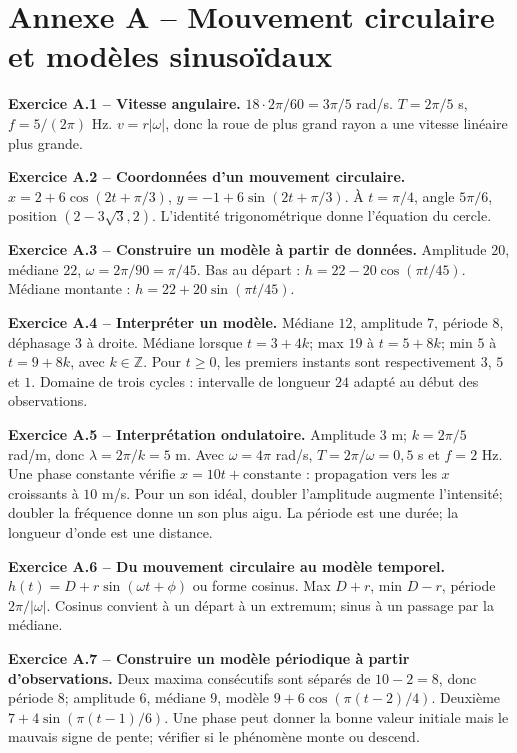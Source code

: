 \chapter*{Annexe A -- Mouvement circulaire et modèles sinusoïdaux}
\begin{answerbox}
\textbf{Exercice A.1 -- Vitesse angulaire.} $18\cdot2\pi/60=3\pi/5$ rad/s. $T=2\pi/5$ s, $f=5/(2\pi)$ Hz. $v=r|\omega|$, donc la roue de plus grand rayon a une vitesse linéaire plus grande.\par
\textbf{Exercice A.2 -- Coordonnées d'un mouvement circulaire.} $x=2+6\cos(2t+\pi/3)$, $y=-1+6\sin(2t+\pi/3)$. À $t=\pi/4$, angle $5\pi/6$, position $(2-3\sqrt3,2)$. L'identité trigonométrique donne l'équation du cercle.\par
\textbf{Exercice A.3 -- Construire un modèle à partir de données.} Amplitude $20$, médiane $22$, $\omega=2\pi/90=\pi/45$. Bas au départ : $h=22-20\cos(\pi t/45)$. Médiane montante : $h=22+20\sin(\pi t/45)$.\par
\textbf{Exercice A.4 -- Interpréter un modèle.} Médiane $12$, amplitude $7$, période $8$, déphasage $3$ à droite. Médiane lorsque $t=3+4k$; max $19$ à $t=5+8k$; min $5$ à $t=9+8k$, avec $k\in\mathbb Z$. Pour $t\ge0$, les premiers instants sont respectivement $3$, $5$ et $1$. Domaine de trois cycles : intervalle de longueur $24$ adapté au début des observations.\par
\textbf{Exercice A.5 -- Interprétation ondulatoire.} Amplitude $3$ m; $k=2\pi/5$ rad/m, donc $\lambda=2\pi/k=5$ m. Avec $\omega=4\pi$ rad/s, $T=2\pi/\omega=0{,}5$ s et $f=2$ Hz. Une phase constante vérifie $x=10t+\text{constante}$ : propagation vers les $x$ croissants à $10$ m/s. Pour un son idéal, doubler l'amplitude augmente l'intensité; doubler la fréquence donne un son plus aigu. La période est une durée; la longueur d'onde est une distance.\par
\textbf{Exercice A.6 -- Du mouvement circulaire au modèle temporel.} $h(t)=D+r\sin(\omega t+\phi)$ ou forme cosinus. Max $D+r$, min $D-r$, période $2\pi/|\omega|$. Cosinus convient à un départ à un extremum; sinus à un passage par la médiane.\par
\textbf{Exercice A.7 -- Construire un modèle périodique à partir d'observations.} Deux maxima consécutifs sont séparés de $10-2=8$, donc période $8$; amplitude $6$, médiane $9$, modèle $9+6\cos(\pi(t-2)/4)$. Deuxième $7+4\sin(\pi(t-1)/6)$. Une phase peut donner la bonne valeur initiale mais le mauvais signe de pente; vérifier si le phénomène monte ou descend.\par

\end{answerbox}
